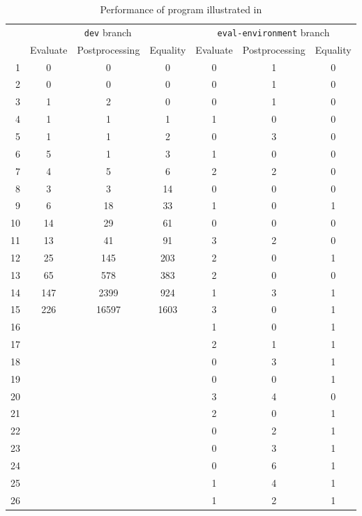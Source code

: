 \begin{singlespace}
  \begin{table}
    \centering
    \begin{tabular}{r|ccc|ccc}
      \hline
      & \multicolumn{3}{c|}{\texttt{dev} branch} & \multicolumn{3}{c}{\texttt{eval-environment} branch} \\
      & Evaluate & Postprocessing & Equality & Evaluate & Postprocessing & Equality \\
      \hline\hline
      1 & 0 & 0 & 0 & 0 & 1 & 0 \\
      2 & 0 & 0 & 0 & 0 & 1 & 0 \\
      3 & 1 & 2 & 0 & 0 & 1 & 0 \\
      4 & 1 & 1 & 1 & 1 & 0 & 0 \\
      5 & 1 & 1 & 2 & 0 & 3 & 0 \\
      6 & 5 & 1 & 3 & 1 & 0 & 0 \\
      7 & 4 & 5 & 6 & 2 & 2 & 0 \\
      8 & 3 & 3 & 14 & 0 & 0 & 0 \\
      9 & 6 & 18 & 33 & 1 & 0 & 1 \\
      10 & 14 & 29 & 61 & 0 & 0 & 0 \\
      11 & 13 & 41 & 91 & 3 & 2 & 0 \\
      12 & 25 & 145 & 203 & 2 & 0 & 1 \\
      13 & 65 & 578 & 383 & 2 & 0 & 0 \\
      14 & 147 & 2399 & 924 & 1 & 3 & 1 \\
      15 & 226 & 16597 & 1603 & 3 & 0 & 1 \\
      16 & & & & 1 & 0 & 1 \\
      17 & & & & 2 & 1 & 1 \\
      18 & & & & 0 & 3 & 1 \\
      19 & & & & 0 & 0 & 1 \\
      20 & & & & 3 & 4 & 0 \\
      21 & & & & 2 & 0 & 1 \\
      22 & & & & 0 & 2 & 1 \\
      23 & & & & 0 & 3 & 1 \\
      24 & & & & 0 & 6 & 1 \\
      25 & & & & 1 & 4 & 1 \\
      26 & & & & 1 & 2 & 1 \\
      \hline\hline
    \end{tabular}
    \caption{Performance of program illustrated in }
    \label{tab:perf-hole-blowup}
  \end{table}
\end{singlespace}


